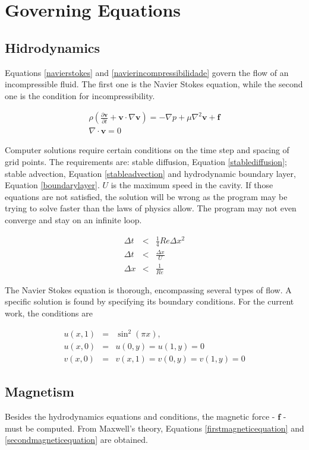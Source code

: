 \documentclass[journal]{IEEEtran}
\begin{document}
\section{Governing Equations}
\subsection{Hidrodynamics}
Equations \ref{navierstokes} and \ref{navierincompressibilidade} govern the flow of an incompressible fluid. The first one is the Navier Stokes equation, while the second one is the condition for incompressibility.

\begin{eqnarray}
\rho\left( \frac{\partial {\textbf{v}}}{\partial t}+\textbf{v}\cdot\nabla \textbf{v} \right)=-\nabla p+\mu\nabla^2 \textbf{v} + \textbf{f}\label{navierstokes}\\
\nabla\cdot\textbf{v}=0\label{navierincompressibilidade}
\end{eqnarray}

Computer solutions require certain conditions on the time step and spacing of grid points. The requirements are: stable diffusion, Equation \ref{stablediffusion}; stable advection, Equation \ref{stableadvection} and hydrodynamic boundary layer, Equation \ref{boundarylayer}. $U$ is the maximum speed in the cavity. If those equations are not satisfied, the solution will be wrong as the program may be trying to solve faster than the laws of physics allow. The program may not even converge and stay on an infinite loop.

\begin{eqnarray}
\Delta t &<& \frac{1}{4}\mathit{Re}\Delta x^2 \label{stablediffusion}\\
\Delta t &<& \frac{\Delta x}{U} \label{stableadvection}\\
\Delta x &<& \frac{1}{\mathit{Re}} \label{boundarylayer}
\end{eqnarray}

The Navier Stokes equation is thorough, encompassing several types of flow. A specific solution is found by specifying its boundary conditions. For the current work, the conditions are

\begin{eqnarray}
u(x,1) & = & \sin^2(\pi x),\\
u(x,0) & = & u(0,y) = u(1,y) = 0\\
v(x,0) & = & v(x,1) = v(0, y) = v(1, y) = 0
\end{eqnarray}

\subsection{Magnetism}
Besides the hydrodynamics equations and conditions, the magnetic force - $\mathbf{f}$ - must be computed. From Maxwell's theory, Equations \ref{firstmagneticequation} and \ref{secondmagneticequation} are obtained. 
\end{document}
